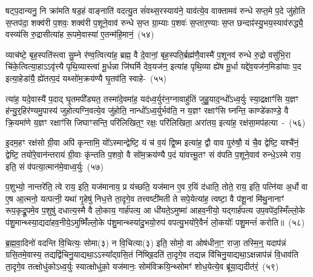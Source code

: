 {\anuvakamend[{सत॑नुं॒ विष्ण॑व॒ इत्या॑ह स॒मारो॑हति॒ ध्याय॑ति॒ तद्वा॒चा यज॑मानः स्यात्करोति क्रू॒रो वेद॑}]}

षट्प॒दान्यनु॒ नि क्रा॑मति षड॒हं वाङ्नाति॑ वदत्यु॒त सं॑वथ्स॒रस्याय॑ने॒ याव॑त्ये॒व वाक्तामव॑ रुन्धे सप्त॒मे प॒दे जु॑होति स॒प्तप॑दा॒ शक्व॑री प॒शवः॒ शक्व॑री प॒शूने॒वाव॑ रुन्धे स॒प्त ग्रा॒म्याः प॒शवः॑ स॒प्तार॒ण्याः स॒प्त छन्दाꣴ॑स्यु॒भय॒स्याव॑रुद्ध्यै॒ वस्व्य॑सि रु॒द्रासीत्या॑ह रू॒पमे॒वास्या॑ ए॒तन्म॑हि॒मानं॒~(५४)\ip

व्याच॑ष्टे॒ बृह॒स्पति॑स्त्वा सु॒म्ने र॑ण्व॒त्वित्या॑ह॒ ब्रह्म॒ वै दे॒वानां॒ बृह॒स्पति॒र्ब्रह्म॑णै॒वास्मै॑ प॒शूनव॑ रुन्धे रु॒द्रो वसु॑भि॒रा चि॑के॒त्वित्या॒हा\-ऽऽवृ॑त्त्यै पृथि॒व्यास्त्वा॑ मू॒र्धन्ना जि॑घर्मि देव॒यज॑न॒ इत्या॑ह पृथि॒व्या ह्ये॑ष मू॒र्धा यद्दे॑व॒यज॑न॒मिडा॑याः प॒द इत्या॒हेडा॑यै॒ ह्ये॑तत्प॒दं यथ्सो॑म॒क्रय॑ण्यै घृ॒तव॑ति॒ स्वाहे-~(५५)\ip

त्या॑ह॒ यदे॒वास्यै॑ प॒दाद् घृ॒तमपी᳚ड्यत॒ तस्मा॑दे॒वमा॑ह॒ यद॑ध्व॒र्युर॑न॒ग्नावाहु॑तिं जुहु॒याद॒न्धो᳚\-ऽध्व॒र्युः स्या॒द्रक्षाꣳ॑सि य॒ज्ञꣳ ह॑न्यु॒र्॒\mbox{}हिर॑ण्यमु॒पास्य॑ जुहोत्यग्नि॒वत्ये॒व जु॑होति॒ नान्धो᳚\-ऽध्व॒र्युर्भव॑ति॒ न य॒ज्ञꣳ रक्षाꣳ॑सि घ्नन्ति॒ काण्डे॑काण्डे॒ वै क्रि॒यमा॑णे य॒ज्ञꣳ रक्षाꣳ॑सि जिघाꣳसन्ति॒ परि॑लिखित॒ꣳ॒ रक्षः॒ परि॑लिखिता॒ अरा॑तय॒ इत्या॑ह॒ रक्ष॑सा॒मप॑हत्या~-~(५६)\ip

इ॒दम॒हꣳ रक्ष॑सो ग्री॒वा अपि॑ कृन्तामि॒ यो᳚\-ऽस्मान्द्वेष्टि॒ यं च॑ व॒यं द्वि॒ष्म इत्या॑ह॒ द्वौ वाव पुरु॑षौ॒ यं चै॒व द्वेष्टि॒ यश्चै॑नं॒ द्वेष्टि॒ तयो॑रे॒वान॑न्तरायं ग्री॒वाः कृ॑न्तति प॒शवो॒ वै सो॑म॒क्रय॑ण्यै प॒दं या॑वत्त्मू॒तꣳ सं व॑पति प॒शूने॒वाव॑ रुन्धे॒\-ऽस्मे राय॒ इति॒ सं व॑पत्या॒त्मान॑मे॒वाध्व॒र्युः~(५७)\ip

प॒शुभ्यो॒ नान्तरे॑ति॒ त्वे राय॒ इति॒ यज॑मानाय॒ प्र य॑च्छति॒ यज॑मान ए॒व र॒यिं द॑धाति॒ तोते॒ राय॒ इति॒ पत्नि॑या अ॒र्धो वा ए॒ष आ॒त्मनो॒ यत्पत्नी॒ यथा॑ गृ॒हेषु॑ निध॒त्ते ता॒दृगे॒व तत्त्वष्टी॑मती ते सपे॒येत्या॑ह॒ त्वष्टा॒ वै प॑शू॒नां मि॑थु॒नानाꣳ॑ रूप॒कृद्रू॒पमे॒व प॒शुषु॑ दधात्य॒स्मै वै लो॒काय॒ गार्\mbox{}ह॑पत्य॒ आ धी॑यते॒\-ऽमुष्मा॑ आहव॒नीयो॒ यद्गार्\mbox{}ह॑पत्य उप॒वपे॑द॒स्मिँल्लो॒के प॑शु॒मान्थ्स्या॒द्यदा॑हव॒नीये॒\-ऽमुष्मिँ॑ल्लो॒के प॑शु॒मान्थ्स्या॑दु॒भयो॒रुप॑ वपत्यु॒भयो॑रे॒वैनं॑ लो॒कयोः᳚ पशु॒मन्तं॑ करोति॥~(५८)\ip

{\anuvakamend[{म॒हि॒मान॒ꣴ॒ स्वाहाप॑हत्या अध्व॒र्युर्धी॑यते॒ चतु॑र्विꣳशतिश्च}]}

ब्र॒ह्म॒वा॒दिनो॑ वदन्ति वि॒चित्यः॒ सोमा(३) न वि॒चित्या(३) इति॒ सोमो॒ वा ओष॑धीना॒ꣳ॒ राजा॒ तस्मि॒न्॒ यदाप॑न्नं ग्रसि॒तमे॒वास्य॒ तद्यद्वि॑चिनु॒याद्यथा॒ऽऽस्या᳚द्ग्रसि॒तं नि॑ष्खि॒दति॑ ता॒दृगे॒व तद्यन्न वि॑चिनु॒याद्यथा॒ऽक्षन्नाप॑न्नं वि॒धाव॑ति ता॒दृगे॒व तत्क्षोधु॑को\-ऽध्व॒र्युः स्यात्क्षोधु॑को॒ यज॑मानः॒ सोम॑विक्रयि॒न्थ्सोमꣳ॑ शोध॒येत्ये॒व ब्रू॑या॒द्यदीत॑रं॒~(५९)\ip


